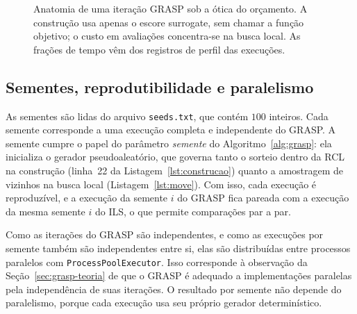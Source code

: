 \documentclass[11pt,a4paper]{article}
\newcommand{\code}[1]{\texttt{#1}}
\begin{document}
\begin{figure}[htbp]
\centering
{}
\caption{Anatomia de uma iteração GRASP sob a ótica do orçamento. A construção usa apenas o escore surrogate, sem chamar a função objetivo; o custo em avaliações concentra-se na busca local. As frações de tempo vêm dos registros de perfil das execuções.}
\label{fig:grasp-anatomia}
\end{figure}

\subsection{Sementes, reprodutibilidade e paralelismo}

As sementes são lidas do arquivo \code{seeds.txt}, que contém $100$ inteiros. Cada semente corresponde a uma execução completa e independente do GRASP. A semente cumpre o papel do parâmetro \emph{semente} do Algoritmo~\ref{alg:grasp}: ela inicializa o gerador pseudoaleatório, que governa tanto o sorteio dentro da RCL na construção (linha~22 da Listagem~\ref{lst:construcao}) quanto a amostragem de vizinhos na busca local (Listagem~\ref{lst:move}). Com isso, cada execução é reproduzível, e a execução da semente $i$ do GRASP fica pareada com a execução da mesma semente $i$ do ILS, o que permite comparações par a par.

Como as iterações do GRASP são independentes, e como as execuções por semente também são independentes entre si, elas são distribuídas entre processos paralelos com \code{ProcessPoolExecutor}. Isso corresponde à observação da Seção~\ref{sec:grasp-teoria} de que o GRASP é adequado a implementações paralelas pela independência de suas iterações. O resultado por semente não depende do paralelismo, porque cada execução usa seu próprio gerador determinístico.
\end{document}
